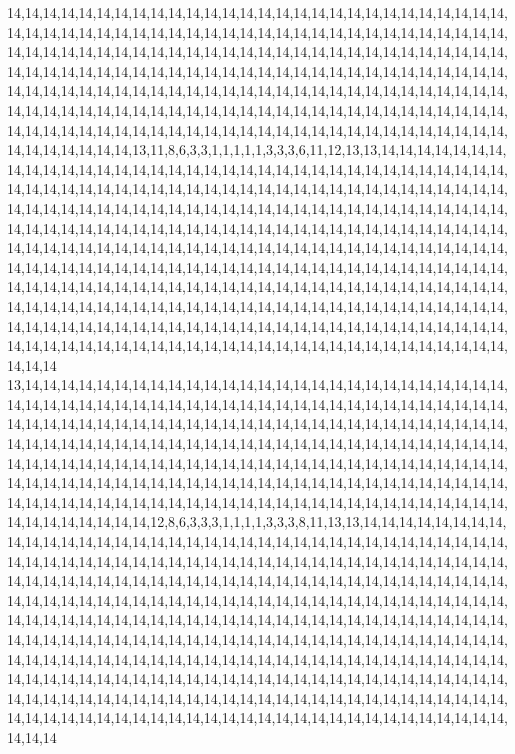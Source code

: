 14,14,14,14,14,14,14,14,14,14,14,14,14,14,14,14,14,14,14,14,14,14,14,14,14,14,14,14,14,14,14,14,14,14,14,14,14,14,14,14,14,14,14,14,14,14,14,14,14,14,14,14,14,14,14,14,14,14,14,14,14,14,14,14,14,14,14,14,14,14,14,14,14,14,14,14,14,14,14,14,14,14,14,14,14,14,14,14,14,14,14,14,14,14,14,14,14,14,14,14,14,14,14,14,14,14,14,14,14,14,14,14,14,14,14,14,14,14,14,14,14,14,14,14,14,14,14,14,14,14,14,14,14,14,14,14,14,14,14,14,14,14,14,14,14,14,14,14,14,14,14,14,14,14,14,14,14,14,14,14,14,14,14,14,14,14,14,14,14,14,14,14,14,14,14,14,14,14,14,14,14,14,14,14,14,14,14,14,14,14,14,14,14,14,14,14,14,14,14,14,14,14,14,13,11,8,6,3,3,1,1,1,1,1,3,3,3,6,11,12,13,13,14,14,14,14,14,14,14,14,14,14,14,14,14,14,14,14,14,14,14,14,14,14,14,14,14,14,14,14,14,14,14,14,14,14,14,14,14,14,14,14,14,14,14,14,14,14,14,14,14,14,14,14,14,14,14,14,14,14,14,14,14,14,14,14,14,14,14,14,14,14,14,14,14,14,14,14,14,14,14,14,14,14,14,14,14,14,14,14,14,14,14,14,14,14,14,14,14,14,14,14,14,14,14,14,14,14,14,14,14,14,14,14,14,14,14,14,14,14,14,14,14,14,14,14,14,14,14,14,14,14,14,14,14,14,14,14,14,14,14,14,14,14,14,14,14,14,14,14,14,14,14,14,14,14,14,14,14,14,14,14,14,14,14,14,14,14,14,14,14,14,14,14,14,14,14,14,14,14,14,14,14,14,14,14,14,14,14,14,14,14,14,14,14,14,14,14,14,14,14,14,14,14,14,14,14,14,14,14,14,14,14,14,14,14,14,14,14,14,14,14,14,14,14,14,14,14,14,14,14,14,14,14,14,14,14,14,14,14,14,14,14,14,14,14,14,14,14,14,14,14,14,14,14,14,14,14,14,14,14,14,14,14,14,14,14,14,14,14,14,14,14,14,14,14,14,14,14,14,14,14,14,14,14,14,14,14,14,14,14,14
13,14,14,14,14,14,14,14,14,14,14,14,14,14,14,14,14,14,14,14,14,14,14,14,14,14,14,14,14,14,14,14,14,14,14,14,14,14,14,14,14,14,14,14,14,14,14,14,14,14,14,14,14,14,14,14,14,14,14,14,14,14,14,14,14,14,14,14,14,14,14,14,14,14,14,14,14,14,14,14,14,14,14,14,14,14,14,14,14,14,14,14,14,14,14,14,14,14,14,14,14,14,14,14,14,14,14,14,14,14,14,14,14,14,14,14,14,14,14,14,14,14,14,14,14,14,14,14,14,14,14,14,14,14,14,14,14,14,14,14,14,14,14,14,14,14,14,14,14,14,14,14,14,14,14,14,14,14,14,14,14,14,14,14,14,14,14,14,14,14,14,14,14,14,14,14,14,14,14,14,14,14,14,14,14,14,14,14,14,14,14,14,14,14,14,14,14,14,14,14,14,14,14,14,12,8,6,3,3,3,1,1,1,1,3,3,3,8,11,13,13,14,14,14,14,14,14,14,14,14,14,14,14,14,14,14,14,14,14,14,14,14,14,14,14,14,14,14,14,14,14,14,14,14,14,14,14,14,14,14,14,14,14,14,14,14,14,14,14,14,14,14,14,14,14,14,14,14,14,14,14,14,14,14,14,14,14,14,14,14,14,14,14,14,14,14,14,14,14,14,14,14,14,14,14,14,14,14,14,14,14,14,14,14,14,14,14,14,14,14,14,14,14,14,14,14,14,14,14,14,14,14,14,14,14,14,14,14,14,14,14,14,14,14,14,14,14,14,14,14,14,14,14,14,14,14,14,14,14,14,14,14,14,14,14,14,14,14,14,14,14,14,14,14,14,14,14,14,14,14,14,14,14,14,14,14,14,14,14,14,14,14,14,14,14,14,14,14,14,14,14,14,14,14,14,14,14,14,14,14,14,14,14,14,14,14,14,14,14,14,14,14,14,14,14,14,14,14,14,14,14,14,14,14,14,14,14,14,14,14,14,14,14,14,14,14,14,14,14,14,14,14,14,14,14,14,14,14,14,14,14,14,14,14,14,14,14,14,14,14,14,14,14,14,14,14,14,14,14,14,14,14,14,14,14,14,14,14,14,14,14,14,14,14,14,14,14,14,14,14,14,14,14,14,14,14,14,14,14,14,14,14
